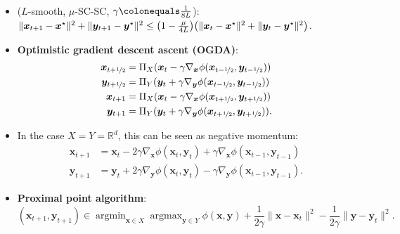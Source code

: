 \documentclass[8pt,a4paper]{extarticle}
\DeclareMathOperator*{\argmax}{argmax}
\DeclareMathOperator*{\argmin}{argmin}
\newcommand{\lft}{\mathopen{}\mathclose\bgroup\left}
\newcommand{\rgt}{\aftergroup\egroup\right}
\newcommand{\R}{\mathbb{R}}
\renewcommand{\vec}[1]{\bm{#1}}
\newenvironment{topic}[1]
{\textbf{\sffamily \colorbox{black}{\rlap{\textbf{\textcolor{white}{#1}}}\hspace{\linewidth}\hspace{-2\fboxsep}}} \\ \vspace{0.2cm}}
{}
\begin{document}
\begin{multicols*}{2}
\begin{topic}{Min-max optimization}
\begin{itemize}
            \item ($L$-smooth, $\mu$-SC-SC, $\gamma \colonequals \frac{1}{8L}$): \\ $\| \vec{x}_{t+1} - \vec{x}^\star \|^2 + \| \vec{y}_{t+1} - \vec{y}^\star \|^2 \leq \lft( 1 - \frac{\mu}{4L} \rgt) \lft( \| \vec{x}_t - \vec{x}^\star \|^2 + \| \vec{y}_t - \vec{y}^\star \|^2 \rgt)$.
            \item \textbf{Optimistic gradient descent ascent (OGDA)}:
                  \begin{align*}
                      \vec{x}_{t+\nicefrac{1}{2}} & = \Pi_X(\vec{x}_t - \gamma \nabla_{\vec{x}} \phi(\vec{x}_{t-\nicefrac{1}{2}}, \vec{y}_{t-\nicefrac{1}{2}}))  \\
                      \vec{y}_{t+\nicefrac{1}{2}} & = \Pi_Y(\vec{y}_t + \gamma \nabla_{\vec{y}} \phi(\vec{x}_{t-\nicefrac{1}{2}}, \vec{y}_{t-\nicefrac{1}{2}}))  \\
                      \vec{x}_{t+1}               & = \Pi_X(\vec{x}_t - \gamma \nabla_{\vec{x}} \phi(\vec{x}_{t+\nicefrac{1}{2}}, \vec{y}_{t+\nicefrac{1}{2}}))  \\
                      \vec{y}_{t+1}               & = \Pi_Y(\vec{y}_t + \gamma \nabla_{\vec{y}} \phi(\vec{x}_{t+\nicefrac{1}{2}}, \vec{y}_{t+\nicefrac{1}{2}})).
                  \end{align*}
            \item In the case $X = Y = \R^d$, this can be seen as negative momentum:
                  \begin{align*}
                      \vec{x}_{t+1} & = \vec{x}_t - 2 \gamma \nabla_{\vec{x}} \phi(\vec{x}_t, \vec{y}_t) + \gamma \nabla_{\vec{x}} \phi(\vec{x}_{t-1}, \vec{y}_{t-1})  \\
                      \vec{y}_{t+1} & = \vec{y}_t + 2 \gamma \nabla_{\vec{y}} \phi(\vec{x}_t, \vec{y}_t) - \gamma \nabla_{\vec{y}} \phi(\vec{x}_{t-1}, \vec{y}_{t-1}).
                  \end{align*}
            \item \textbf{Proximal point algorithm}: \[
                      (\vec{x}_{t+1}, \vec{y}_{t+1}) \in \argmin_{\vec{x} \in X} \argmax_{\vec{y} \in Y} \phi(\vec{x}, \vec{y}) + \frac{1}{2 \gamma} \| \vec{x} - \vec{x}_t \|^2 - \frac{1}{2 \gamma} \| \vec{y} - \vec{y}_t \|^2.
                  \]
        \end{itemize}
    \end{topic}


\end{multicols*}
\end{document}
